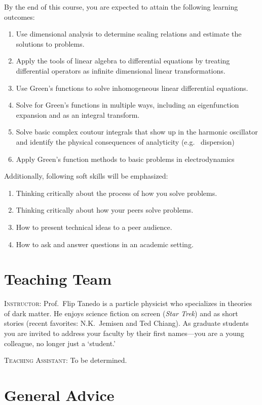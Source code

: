 \documentclass[12pt]{article}
\numberwithin{equation}{section}    %
\begin{document}
By the end of this course, you are expected to attain the following learning outcomes:
\begin{enumerate}
	\item Use dimensional analysis to determine scaling relations and estimate the solutions to problems.
	\item Apply the tools of linear algebra to differential equations by treating differential operators as infinite dimensional linear transformations.
	\item Use Green's functions to solve inhomogeneous linear differential equations.
	\item Solve for Green's functions in multiple ways, including an eigenfunction expansion and as an integral transform.
	\item Solve basic complex coutour integrals that show up in the harmonic oscillator and identify the physical consequences of analyticity (e.g.~ dispersion)
	\item Apply Green's function methods to basic problems in electrodynamics
\end{enumerate}
Additionally, following soft skills will be emphasized:
\begin{enumerate}
	\item Thinking critically about the process of how you solve problems.
	\item Thinking critically about how your peers solve problems.
	\item How to present technical ideas to a peer audience.
	\item How to ask and answer questions in an academic setting.
\end{enumerate}

\section*{Teaching Team}

\noindent \textsc{Instructor}: Prof.~Flip Tanedo is a particle physicist who specializes in theories of dark matter. He enjoys science fiction on screen (\emph{Star Trek}) and as short stories (recent favorites: N.K.~Jemisen and Ted Chiang). As graduate students you are invited to address your faculty by their first names---you are a young colleague, no longer just a `student.' 

\vspace{.5em}
\noindent \textsc{Teaching Assistant}: To be determined.

\section*{General Advice}
\end{document}
